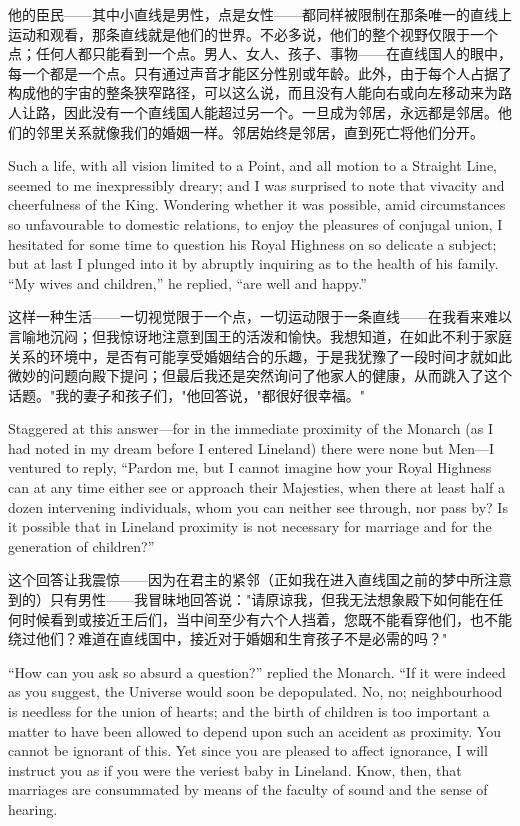 \documentclass[12pt,UTF8]{ctexbook}
\begin{document}
他的臣民——其中小直线是男性，点是女性——都同样被限制在那条唯一的直线上运动和观看，那条直线就是他们的世界。不必多说，他们的整个视野仅限于一个点；任何人都只能看到一个点。男人、女人、孩子、事物——在直线国人的眼中，每一个都是一个点。只有通过声音才能区分性别或年龄。此外，由于每个人占据了构成他的宇宙的整条狭窄路径，可以这么说，而且没有人能向右或向左移动来为路人让路，因此没有一个直线国人能超过另一个。一旦成为邻居，永远都是邻居。他们的邻里关系就像我们的婚姻一样。邻居始终是邻居，直到死亡将他们分开。

Such a life, with all vision limited to a Point, and all motion to a Straight Line, seemed to me inexpressibly dreary; and I was surprised to note that vivacity and cheerfulness of the King. Wondering whether it was possible, amid circumstances so unfavourable to domestic relations, to enjoy the pleasures of conjugal union, I hesitated for some time to question his Royal Highness on so delicate a subject; but at last I plunged into it by abruptly inquiring as to the health of his family. ``My wives and children,'' he replied, ``are well and happy.''

这样一种生活——一切视觉限于一个点，一切运动限于一条直线——在我看来难以言喻地沉闷；但我惊讶地注意到国王的活泼和愉快。我想知道，在如此不利于家庭关系的环境中，是否有可能享受婚姻结合的乐趣，于是我犹豫了一段时间才就如此微妙的问题向殿下提问；但最后我还是突然询问了他家人的健康，从而跳入了这个话题。"我的妻子和孩子们，"他回答说，"都很好很幸福。"

Staggered at this answer---for in the immediate proximity of the Monarch (as I had noted in my dream before I entered Lineland) there were none but Men---I ventured to reply, ``Pardon me, but I cannot imagine how your Royal Highness can at any time either see or approach their Majesties, when there at least half a dozen intervening individuals, whom you can neither see through, nor pass by? Is it possible that in Lineland proximity is not necessary for marriage and for the generation of children?''

这个回答让我震惊——因为在君主的紧邻（正如我在进入直线国之前的梦中所注意到的）只有男性——我冒昧地回答说："请原谅我，但我无法想象殿下如何能在任何时候看到或接近王后们，当中间至少有六个人挡着，您既不能看穿他们，也不能绕过他们？难道在直线国中，接近对于婚姻和生育孩子不是必需的吗？"

``How can you ask so absurd a question?'' replied the Monarch. ``If it were indeed as you suggest, the Universe would soon be depopulated. No, no; neighbourhood is needless for the union of hearts; and the birth of children is too important a matter to have been allowed to depend upon such an accident as proximity. You cannot be ignorant of this. Yet since you are pleased to affect ignorance, I will instruct you as if you were the veriest baby in Lineland. Know, then, that marriages are consummated by means of the faculty of sound and the sense of hearing.
\end{document}
